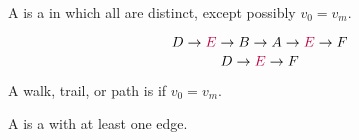 \begin{frame}{}
  \begin{definition}[Path (路径)]
    A  is a  in which all  are distinct,
    except possibly $v_{0} = v_{m}$.
  \end{definition}

  \pause
  \[
    D \to \textcolor{purple}{E} \to B \to A \to \textcolor{purple}{E} \to F
  \]
  \[
    D \to \textcolor{purple}{E} \to F
  \]
\end{frame}

\begin{frame}{}
  \begin{definition}
    A walk, trail, or path is  if $v_{0} = v_{m}$.
  \end{definition}

  \pause

  \pause
  \begin{definition}[Cycle]
    A  is a  with at least one edge.
  \end{definition}
\end{frame}
